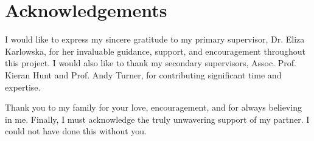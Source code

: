 \chapter*{\center \Large  Acknowledgements}

I would like to express my sincere gratitude to my primary supervisor, Dr. Eliza Karlowska, for her invaluable guidance, support, and encouragement throughout this project. I would also like to thank my secondary supervisors, Assoc. Prof. Kieran Hunt and Prof. Andy Turner, for contributing significant time and expertise.

Thank you to my family for your love, encouragement, and for always believing in me. Finally, I must acknowledge the truly unwavering support of my partner. I could not have done this without you.